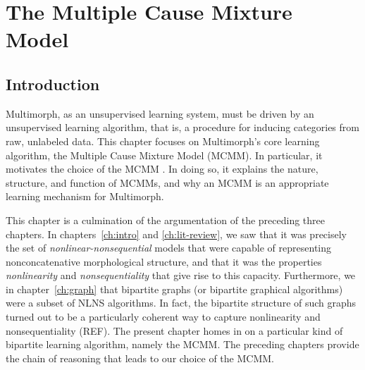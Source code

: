 \chapter{The Multiple Cause Mixture Model}
\label{ch:MCMM}

\section{Introduction}
\label{sec:mcmm:intro}
Multimorph, as an unsupervised learning system, must be 
driven by an unsupervised learning algorithm, that is, 
a procedure for inducing categories from raw, unlabeled data.
This chapter focuses on Multimorph's core learning algorithm, the Multiple Cause Mixture Model (MCMM). In particular, it motivates the choice of the MCMM \citep{saund:94}. In doing so, it explains the nature, structure, and function of MCMMs, and why an MCMM is an appropriate learning mechanism for Multimorph. 

This chapter is a culmination of the argumentation of the preceding three chapters. 
In chapters~\ref{ch:intro} and \ref{ch:lit-review}, we saw that it was precisely 
the set of \emph{nonlinear-nonsequential} models that were capable of representing 
nonconcatenative morphological structure, and that it was the properties \emph{nonlinearity}
and \emph{nonsequentiality} that give rise to this capacity. Furthermore, we in 
chapter~\ref{ch:graph} that bipartite graphs (or bipartite graphical algorithms) were a subset of NLNS algorithms. In fact, the bipartite structure of such graphs turned out to be a particularly coherent way to capture nonlinearity and nonsequentiality (REF).
The present chapter homes in on a particular kind of bipartite learning algorithm, namely the MCMM. The preceding chapters provide the chain of reasoning that leads to our choice of the MCMM.


